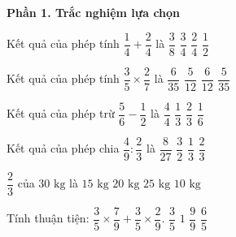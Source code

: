 \textbf{Phần 1. Trắc nghiệm lựa chọn}

\begin{ex} %
Kết quả của phép tính $\dfrac{1}{4} + \dfrac{2}{4}$ là
\choice
{$\dfrac{3}{8}$}
{\True $\dfrac{3}{4}$}
{$\dfrac{2}{4}$}
{$\dfrac{1}{2}$}
\end{ex}

\begin{ex} %
Kết quả của phép tính $\dfrac{3}{5} \times \dfrac{2}{7}$ là
\choice
{\True $\dfrac{6}{35}$}
{$\dfrac{5}{12}$}
{$\dfrac{6}{12}$}
{$\dfrac{5}{35}$}
\end{ex}

\begin{ex} %
Kết quả của phép trừ $\dfrac{5}{6} - \dfrac{1}{2}$ là
\choice
{$\dfrac{4}{4}$}
{\True $\dfrac{1}{3}$}
{$\dfrac{2}{3}$}
{$\dfrac{1}{6}$}
\end{ex}

\begin{ex} %
Kết quả của phép chia $\dfrac{4}{9} : \dfrac{2}{3}$ là
\choice
{$\dfrac{8}{27}$}
{$\dfrac{3}{2}$}
{$\dfrac{1}{3}$}
{\True $\dfrac{2}{3}$}
\end{ex}

\begin{ex} %
$\dfrac{2}{3}$ của $30\text{ kg}$ là
\choice
{$15\text{ kg}$}
{\True $20\text{ kg}$}
{$25\text{ kg}$}
{$10\text{ kg}$}
\end{ex}

\begin{ex} %
Tính thuận tiện: $\dfrac{3}{5} \times \dfrac{7}{9} + \dfrac{3}{5} \times \dfrac{2}{9}$.
\choice
{\True $\dfrac{3}{5}$}
{$1$}
{$\dfrac{9}{9}$}
{$\dfrac{6}{5}$}
\end{ex}

